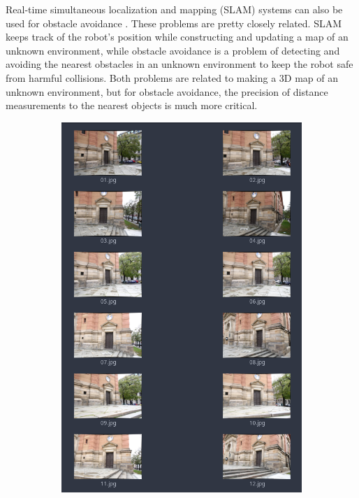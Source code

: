 Real-time simultaneous localization and mapping (SLAM) systems can also be used for obstacle avoidance \cite{Moreno2014}. 
These problems are pretty closely related. 
SLAM keeps track of the robot's position while constructing and updating a map of an unknown environment, while obstacle avoidance is a problem of detecting and avoiding the nearest obstacles in an unknown environment to keep the robot safe from harmful collisions.
Both problems are related to making a 3D map of an unknown environment, but for obstacle avoidance, the precision of distance measurements to the nearest objects is much more critical.

\begin{figure}[h]
    \begin{subfigure}[h]{0.31\textwidth}
      \includegraphics[width=\textwidth]{graphics/input_set.png}

\end{subfigure}
\end{figure}
